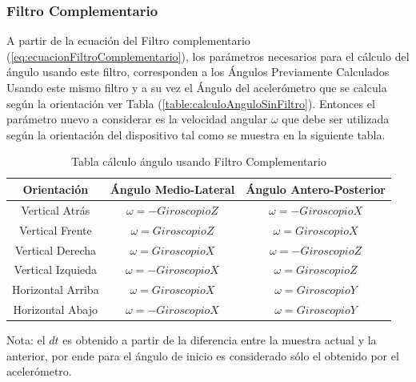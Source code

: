 \documentclass[12pt,a4paper]{article}
\begin{document}
\subsubsection{Filtro Complementario}
A partir de la ecuación del Filtro complementario (\ref{eq:ecuacionFiltroComplementario}), los parámetros necesarios para el cálculo del ángulo usando este filtro, corresponden a los Ángulos Previamente Calculados Usando este mismo filtro y a su vez el Ángulo del acelerómetro que se calcula según la orientación ver Tabla (\ref{table:calculoAnguloSinFiltro}).
Entonces el parámetro nuevo a considerar es la velocidad angular $\omega$ que debe ser utilizada según la orientación del dispositivo tal como se muestra en la siguiente tabla.

\begin{table}[H]
	\centering
	\label{table:calculoAnguloFiltroComplementario}
	\begin{tabular}{|c|c|c|}
		\hline 
		\textbf{Orientación} & \textbf{Ángulo Medio-Lateral} & \textbf{Ángulo Antero-Posterior} \\ 
		\hline 
		Vertical Atrás & $\omega= -GiroscopioZ$ &  $\omega= -GiroscopioX$ \\ 
		\hline 
		Vertical Frente & $\omega= GiroscopioZ$ &  $\omega= GiroscopioX$ \\
		\hline 
		Vertical Derecha & $\omega= GiroscopioX$ &  $\omega= -GiroscopioZ$ \\ 
		\hline 
		Vertical Izquieda & $\omega= -GiroscopioX$ &  $\omega= GiroscopioZ$ \\ 
		\hline 
		Horizontal Arriba & $\omega= GiroscopioX$ &  $\omega= GiroscopioY$ \\ 
		\hline 
		Horizontal Abajo & $\omega= -GiroscopioX$ &  $\omega= GiroscopioY$ \\ 
		\hline 
	\end{tabular}
	\caption{Tabla cálculo ángulo usando Filtro Complementario} 
\end{table}

Nota: el $dt$ es obtenido a partir de la diferencia entre la muestra actual y la anterior, por ende para el ángulo de inicio es considerado sólo el obtenido por el acelerómetro.
\end{document}
